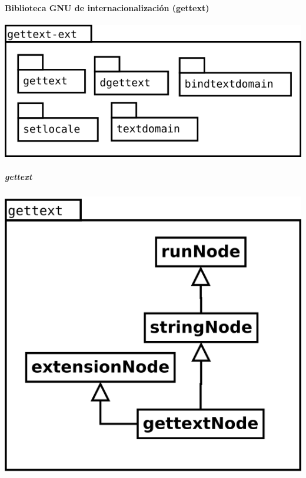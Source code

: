 \paragraph{Biblioteca GNU de internacionalización (gettext)}
\begin{center}
\includegraphics[scale=0.4]{gettext-ext-package.png} \\
\end{center}
\subparagraph {gettext}
\begin{center}
\includegraphics[scale=0.4]{gettext.png} \\
\end{center}
